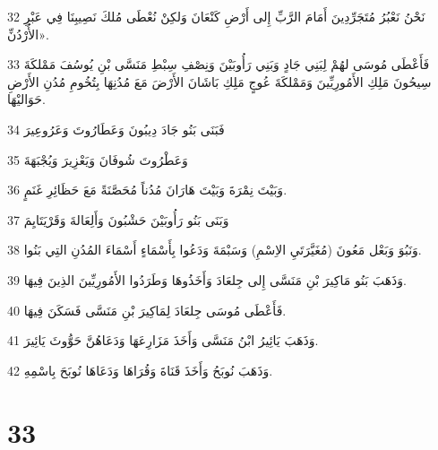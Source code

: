 \par 32 نَحْنُ نَعْبُرُ مُتَجَرِّدِينَ أَمَامَ الرَّبِّ إِلى أَرْضِ كَنْعَانَ وَلكِنْ نُعْطَى مُلكَ نَصِيبِنَا فِي عَبْرِ الأُرْدُنِّ».
\par 33 فَأَعْطَى مُوسَى لهُمْ لِبَنِي جَادٍ وَبَنِي رَأُوبَيْنَ وَنِصْفِ سِبْطِ مَنَسَّى بْنِ يُوسُفَ مَمْلكَةَ سِيحُونَ مَلِكِ الأَمُورِيِّينَ وَمَمْلكَةَ عُوجٍ مَلِكِ بَاشَانَ الأَرْضَ مَعَ مُدُنِهَا بِتُخُومِ مُدُنِ الأَرْضِ حَوَاليْهَا.
\par 34 فَبَنَى بَنُو جَادَ دِيبُونَ وَعَطَارُوتَ وَعَرُوعِيرَ
\par 35 وَعَطْرُوتَ شُوفَانَ وَيَعْزِيرَ وَيُجْبَهَةَ
\par 36 وَبَيْتَ نِمْرَةَ وَبَيْتَ هَارَانَ مُدُناً مُحَصَّنَةً مَعَ حَظَائِرِ غَنَمٍ.
\par 37 وَبَنَى بَنُو رَأُوبَيْنَ حَشْبُونَ وَأَلِعَالةَ وَقَرْيَتَايِمَ
\par 38 وَنَبُوَ وَبَعْل مَعُونَ (مُغَيَّرَتَيِ الاِسْمِ) وَسَبْمَةَ وَدَعُوا بِأَسْمَاءٍ أَسْمَاءَ المُدُنِ التِي بَنُوا.
\par 39 وَذَهَبَ بَنُو مَاكِيرَ بْنِ مَنَسَّى إِلى جِلعَادَ وَأَخَذُوهَا وَطَرَدُوا الأَمُورِيِّينَ الذِينَ فِيهَا.
\par 40 فَأَعْطَى مُوسَى جِلعَادَ لِمَاكِيرَ بْنِ مَنَسَّى فَسَكَنَ فِيهَا.
\par 41 وَذَهَبَ يَائِيرُ ابْنُ مَنَسَّى وَأَخَذَ مَزَارِعَهَا وَدَعَاهُنَّ حَوُّوثَ يَائِيرَ.
\par 42 وَذَهَبَ نُوبَحُ وَأَخَذَ قَنَاةَ وَقُرَاهَا وَدَعَاهَا نُوبَحَ بِاسْمِهِ.

\chapter{33}

